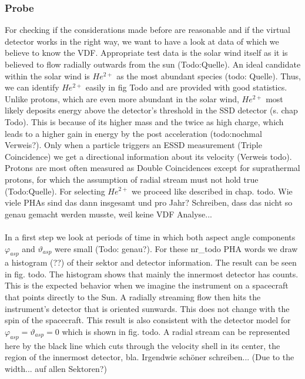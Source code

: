 \subsubsection{Probe}
For checking if the considerations made before are reasonable and if the virtual detector works in the right way, we want to have a look at data of which we believe to know the VDF. Appropriate test data is the solar wind itself as it is believed to flow radially outwards from the sun (Todo:Quelle). An ideal candidate within the solar wind is $He^{2+}$ as the most abundant species (todo: Quelle). Thus, we can identify $He^{2+}$ easily in fig Todo and are provided with good statistics. Unlike protons, which are even more abundant in the solar wind, $He^{2+}$ most likely deposits energy above the detector's threshold in the SSD detector (s. chap Todo). This is because of its higher mass and the twice as high charge, which leads to a higher gain in energy by the post acceleration (todo:nochmal Verweis?). Only when a particle triggers an ESSD measurement (Triple Coincidence) we get a directional information about its velocity (Verweis todo). Protons are most often measured as Double Coincidences except for suprathermal protons, for which the assumption of radial stream must not hold true (Todo:Quelle). For selecting $He^{2+}$ we proceed like described in chap. todo.
Wie viele PHAs sind das dann insgesamt und pro Jahr? Schreiben, dass das nicht so genau gemacht werden musste, weil keine VDF Analyse...
\\ \\
In a first step we look at periods of time in which both aspect angle components $\varphi_{asp}$ and $\vartheta_{asp}$ were small (Todo: genau?). For these nr\_todo PHA words we draw a histogram (??) of their sektor and detector information. The result can be seen in fig. todo. The histogram shows that mainly the innermost detector has counts. This is the expected behavior when we imagine the instrument on a spacecraft that points directly to the Sun. A radially streaming flow then hits the instrument's detector that is oriented sunwards. This does not change with the spin of the spacecraft. This result is also consistent with the detector model for $\varphi_{asp} = \vartheta_{asp} = 0$ which is shown in fig. todo. A radial stream can be represented here by the black line which cuts through the velocity shell in its center, the region of the innermost detector, bla. Irgendwie schöner schreiben...
(Due to the width... auf allen Sektoren?)
\\ \\
